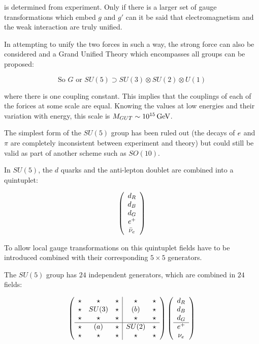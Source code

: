 is determined from experiment.  Only if there is a larger set of gauge transformations which embed $g$ and $g'$ can it be said that electromagnetism and the weak interaction are truly unified.

In attempting to unify the two forces in such a way, the strong force can also be considered and a Grand Unified Theory which encompasses all groups can be proposed:

\[
  \textrm{So }G \textrm{ or } SU(5) \supset SU(3) \otimes SU(2) \otimes U(1)
\]

where there is one coupling constant.  This implies that the couplings of each of the forices at some scale are equal.  Knowing the values at low energies and their variation with energy, this scale is $M_{GUT} \sim 10^{15}\mathrm{\,GeV}$.

The simplest form of the $SU(5)$ group has been ruled out (the decays of $e$ and $\pi$ are completely inconsistent between experiment and theory) but could still be valid as part of another scheme such as $SO(10)$.

In $SU(5)$, the $d$ quarks and the anti-lepton doublet are combined into a quintuplet:

\[
  \left(
  \begin{array}{c}
  d_R \\ d_B \\ d_G \\ e^+ \\ \bar{\nu}_{e}
  \end{array}
  \right)
\]

To allow local gauge transformations on this quintuplet fields have to be introduced combined with their corresponding $5 \times 5$ generators.

The $SU(5)$ group has $24$ independent generators, which are combined in $24$ fields:

\[
  \left(
  \begin{array}{ccc|cc}
    \star & \star & \star & \star & \star \\
    \star & SU(3) & \star &  (b)  & \star \\
    \star & \star & \star & \star & \star \\
    \hline
    \star &  (a)  & \star & SU(2) & \star \\
    \star & \star & \star & \star & \star \\
  \end{array}
  \right)
  \left(
  \begin{array}{c}
    d_R \\
    d_B \\
    d_G \\
    \hline
    e^+ \\
    \nu_{e}
  \end{array}
  \right)
\]

